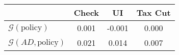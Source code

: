 \begin{tabular}{@{}lccc@{}} 
\toprule 
                          & Check      & UI    & Tax Cut    \\  \midrule 
$\mathcal{G}(\text{policy})$ & 0.001  & -0.001  & 0.000     \\ 
$\mathcal{G}(AD,\text{policy})$ & 0.021  & 0.014  & 0.007     \\ 
\end{tabular}  
